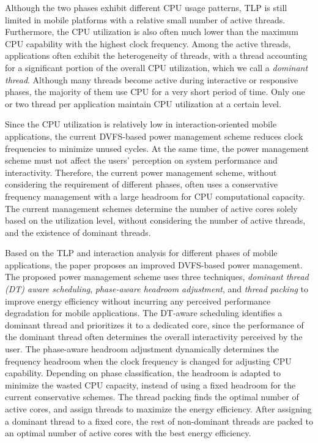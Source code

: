 Although the two phases exhibit different CPU usage patterns, TLP is still limited in
mobile platforms with a relative small number of active threads. Furthermore, the CPU utilization 
is also often much lower than the maximum CPU capability with the highest clock frequency. 
Among the active threads, applications often exhibit the heterogeneity of threads, with a thread
accounting for a significant portion of the overall CPU utilization, which we call a {\it dominant thread}.
Although many threads become active during interactive or responsive phases, the majority of them
use CPU for a very short period of time. Only one or two thread per application 
maintain CPU utilization at a certain level.

Since the CPU utilization is relatively low in interaction-oriented mobile applications, the 
current DVFS-based power management scheme reduces clock frequencies to minimize unused cycles. 
At the same time, the power management scheme must not affect the users' perception on system performance and 
interactivity. Therefore, the current power management scheme, without considering the requirement
of different phases, often uses a conservative frequency management with a large headroom 
for CPU computational capacity. The current management schemes determine the number of active cores
solely based on the utilization level, without considering the number of active threads, and the 
existence of dominant threads.

Based on the TLP and interaction analysis for different phases of mobile applications, the paper proposes an improved
DVFS-based power management. The proposed power management scheme uses three techniques,
{\it dominant thread (DT) aware scheduling}, {\it phase-aware headroom adjustment}, and {\it thread packing} 
to improve energy efficiency without incurring any perceived performance 
degradation for mobile applications.
The DT-aware scheduling identifies a dominant thread and prioritizes it to a dedicated core, since
the performance of the dominant thread often determines the overall interactivity perceived by the user.
The phase-aware headroom adjustment dynamically determines the frequency headroom when
the clock frequency is changed for adjusting CPU capability. Depending on phase classification,
the headroom is adapted to minimize the wasted CPU capacity, instead of using a fixed headroom
for the current conservative schemes.
The thread packing finds the optimal number of active cores, and assign threads to maximize
the energy efficiency. After assigning a dominant thread to a fixed core,
the rest of non-dominant threads are packed to an optimal number of active cores with the best energy
efficiency. 


